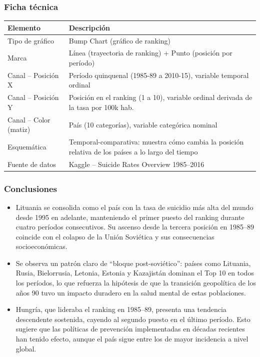 \documentclass[12pt, letterpaper]{article}
\begin{document}
\subsubsection*{Ficha t\'ecnica}

\begin{table}[H]
  \centering
  \begin{tabularx}{\textwidth}{lX}
    \toprule
    \textbf{Elemento} & \textbf{Descripci\'on} \\
    \midrule
    Tipo de gr\'afico & Bump Chart (gr\'afico de ranking) \\
    Marca & L\'inea (trayectoria de ranking) + Punto (posici\'on por per\'iodo) \\
    Canal -- Posici\'on X & Per\'iodo quinquenal (1985-89 a 2010-15), variable temporal ordinal \\
    Canal -- Posici\'on Y & Posici\'on en el ranking (1 a 10), variable ordinal derivada de la tasa por 100k hab. \\
    Canal -- Color (matiz) & Pa\'is (10 categor\'ias), variable categ\'orica nominal \\
    Esquem\'atica & Temporal-comparativa: muestra c\'omo cambia la posici\'on relativa de los pa\'ises a lo largo del tiempo \\
    Fuente de datos & Kaggle -- Suicide Rates Overview 1985--2016 \\
    \bottomrule
  \end{tabularx}
\end{table}

\subsubsection*{Conclusiones}

\begin{itemize}
  \item Lituania se consolida como el pa\'is con la tasa de suicidio m\'as alta del mundo desde 1995 en adelante, manteniendo el primer puesto del ranking durante cuatro per\'iodos consecutivos. Su ascenso desde la tercera posici\'on en 1985--89 coincide con el colapso de la Uni\'on Sovi\'etica y sus consecuencias socioecon\'omicas.
  \item Se observa un patr\'on claro de ``bloque post-sovi\'etico'': pa\'ises como Lituania, Rusia, Bielorrusia, Letonia, Estonia y Kazajist\'an dominan el Top 10 en todos los per\'iodos, lo que refuerza la hip\'otesis de que la transici\'on geopol\'itica de los a\~nos 90 tuvo un impacto duradero en la salud mental de estas poblaciones.
  \item Hungr\'ia, que lideraba el ranking en 1985--89, presenta una tendencia descendente sostenida, cayendo al segundo puesto en el \'ultimo per\'iodo. Esto sugiere que las pol\'iticas de prevenci\'on implementadas en d\'ecadas recientes han tenido efecto, aunque el pa\'is sigue entre los de mayor incidencia a nivel global.
\end{itemize}
\end{document}

